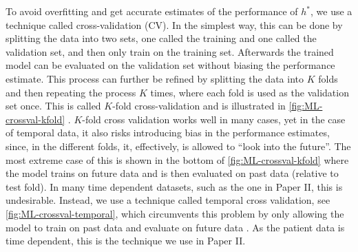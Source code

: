 To avoid overfitting and get accurate estimates of the performance of $h^*$, we use a technique called cross-validation (CV). In the simplest way, this can be done by splitting the data into two sets, one called the training and one called the validation set, and then only train on the training set. Afterwards the trained model can be evaluated on the validation set without biasing the performance estimate. This process can further be refined by splitting the data into $K$ folds and then repeating the process $K$ times, where each fold is used as the validation set once.
This is called $K$-fold cross-validation and is illustrated in \autoref{fig:ML-crossval-kfold} \autocite{murphyMachineLearningProbabilistic2012,hastieElementsStatisticalLearning2016}.
$K$-fold cross validation works well in many cases, yet in the case of temporal data, it also risks introducing bias in the performance estimates, since, in the different folds, it, effectively, is allowed to ``look into the future''. The most extreme case of this is shown in the bottom of \autoref{fig:ML-crossval-kfold} where the model trains on future data and is then evaluated on past data (relative to test fold). In many time dependent datasets, such as the one in Paper II, this is undesirable. Instead, we use a technique called temporal cross validation, see \autoref{fig:ML-crossval-temporal}, which circumvents this problem by only allowing the model to train on past data and evaluate on future data \autocite{tashmanOutofsampleTestsForecasting2000a}. As the patient data is time dependent, this is the technique we use in Paper II.

